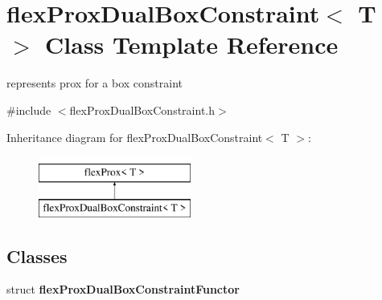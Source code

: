 \hypertarget{classflex_prox_dual_box_constraint}{}\section{flex\+Prox\+Dual\+Box\+Constraint$<$ T $>$ Class Template Reference}
\label{classflex_prox_dual_box_constraint}


represents prox for a box constraint  




{\ttfamily \#include $<$flex\+Prox\+Dual\+Box\+Constraint.\+h$>$}

Inheritance diagram for flex\+Prox\+Dual\+Box\+Constraint$<$ T $>$\+:\begin{figure}[H]
\begin{center}
\leavevmode
\includegraphics[height=2.000000cm]{classflex_prox_dual_box_constraint}
\end{center}
\end{figure}
\subsection*{Classes}
\begin{DoxyCompactItemize}
\item 
struct {\bfseries flex\+Prox\+Dual\+Box\+Constraint\+Functor}
\end{DoxyCompactItemize}
